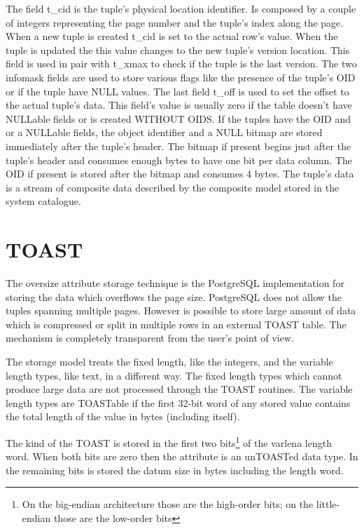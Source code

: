 The field t\_cid is the tuple's physical location identifier. Is composed by a couple of
integers representing the page number and the tuple's index along the page. When a new tuple is created
t\_cid is set to the actual row's value. When the tuple is updated the this
value changes to the new tuple's version location. This field is used in pair with t\_xmax to check if
the tuple is the last version. The two infomask fields are used to store various flags like the presence of
the tuple's OID or if the tuple have NULL values. The last field t\_off is used to set the offset to the
actual tuple's data. This field's value is usually zero if the table doesn't have NULLable fields or is
created WITHOUT OIDS. If the tuples have the OID and or a NULLable fields, the object identifier and
a NULL bitmap are stored immediately after the tuple's header. The bitmap if present begins just after the
tuple's header and consumes enough bytes to have one bit per data column. The OID if present is stored
after the bitmap and consumes 4 bytes. The tuple's data is a stream of composite data described by the
composite model stored in the system catalogue.


\section{TOAST}
\label{sec:TOAST}
The oversize attribute storage technique is the PostgreSQL implementation for storing the data
which overflows the page size. PostgreSQL does not allow the tuples spanning multiple pages. However is
possible to store large amount of data which is compressed or split in multiple rows in an external
TOAST table. The mechanism is completely transparent from the user's point of view.\newline

The storage model treats the fixed length, like the integers, and the variable length types, like text, in
a different way. The fixed length types which cannot produce large data are not processed through the TOAST
routines. The variable length types are TOASTable if the first 32-bit word of any stored value contains the
total length of the value in bytes (including itself).

The kind of the TOAST is stored in the first two bits\footnote{On the big-endian architecture those are the
high-order bits; on the little-endian those are the low-order bits} of the varlena length
word. When both bits are zero then the attribute is an unTOASTed data type. In the remaining bits is stored
the datum size in bytes including the length word.\newline

